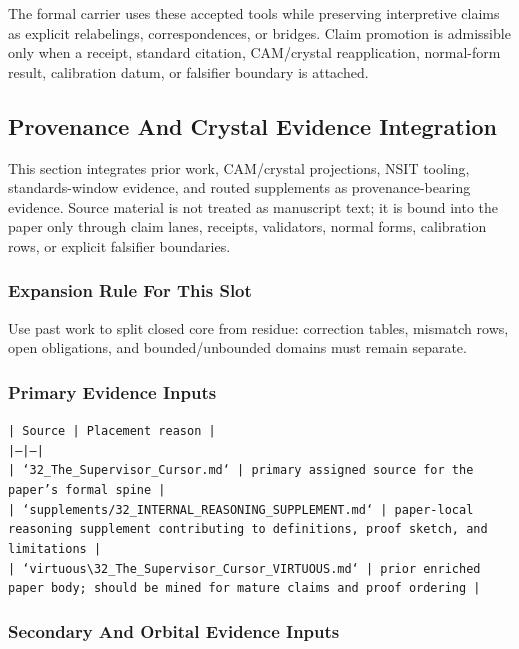 \documentclass[11pt]{article}
\begin{document}
The formal carrier uses these accepted tools while preserving interpretive
claims as explicit relabelings, correspondences, or bridges. Claim promotion is admissible only when a receipt, standard citation,
CAM/crystal reapplication, normal-form result, calibration datum, or falsifier
boundary is attached.

\subsection*{Provenance And Crystal Evidence Integration}

This section integrates prior work, CAM/crystal projections, NSIT tooling,
standards-window evidence, and routed supplements as provenance-bearing
evidence. Source material is not treated as manuscript text; it is bound into
the paper only through claim lanes, receipts, validators, normal forms,
calibration rows, or explicit falsifier boundaries.

\subsubsection*{Expansion Rule For This Slot}

Use past work to split closed core from residue: correction tables, mismatch rows, open obligations, and bounded/unbounded domains must remain separate.

\subsubsection*{Primary Evidence Inputs}

\noindent\texttt{| Source | Placement reason |}\\
\noindent\texttt{|---|---|}\\
\noindent\texttt{| `32\_The\_Supervisor\_Cursor.md` | primary assigned source for the paper's formal spine |}\\
\noindent\texttt{| `supplements/32\_INTERNAL\_REASONING\_SUPPLEMENT.md` | paper-local reasoning supplement contributing to definitions, proof sketch, and limitations |}\\
\noindent\texttt{| `virtuous\textbackslash{}32\_The\_Supervisor\_Cursor\_VIRTUOUS.md` | prior enriched paper body; should be mined for mature claims and proof ordering |}\\

\subsubsection*{Secondary And Orbital Evidence Inputs}
\end{document}

